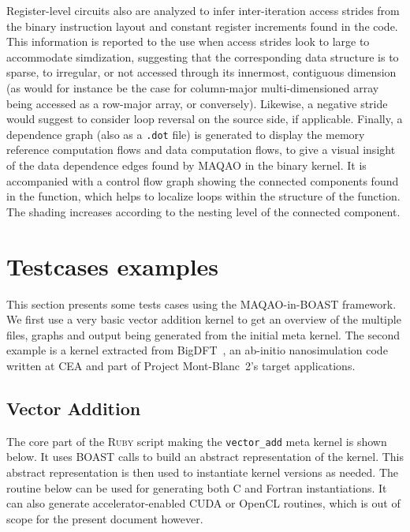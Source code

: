 \documentclass[11pt, a4paper, twoside]{montblanc2}
\def\ruby{\textsc{Ruby}\xspace}
\begin{document}
Register-level circuits also are analyzed to infer inter-iteration access 
strides from the binary instruction layout and constant register increments 
found in the code. This information is reported to the use when access strides 
look to large to accommodate simdization, suggesting that the corresponding data 
structure is to sparse, to irregular, or not accessed through its innermost, 
contiguous dimension (as would for instance be the case for column-major 
multi-dimensioned array being accessed as a row-major array, or conversely). 
Likewise, a negative stride would suggest to consider loop reversal on the 
source side, if applicable. Finally, a dependence graph (also as a \verb|.dot| 
file) is generated to display the memory reference computation flows and data 
computation flows, to give a visual insight of the data dependence edges found 
by MAQAO in the binary kernel. It is accompanied with a control flow graph 
showing the connected components found in the function, which helps to localize 
loops within the structure of the function. The shading increases according to 
the nesting level of the connected component.

\section{Testcases examples}\label{sec:examples}

This section presents some tests cases using the MAQAO-in-BOAST framework. We 
first use a very basic vector addition kernel to get an overview of the multiple 
files, graphs and output being generated from the initial meta kernel. The 
second example is a kernel extracted from 
BigDFT~\cite{genovese:bigdft:jcp:2008}, an ab-initio nanosimulation code written 
at CEA and part of Project Mont-Blanc~2's target applications.

  \subsection{Vector Addition}

  The core part of the \ruby script making the \verb|vector_add| meta kernel is 
  shown below. It uses BOAST calls to build an abstract representation of the 
  kernel. This abstract representation is then used to instantiate kernel 
  versions as needed. The routine below can be used for generating both C and 
  Fortran instantiations. It can also generate accelerator-enabled CUDA or 
  OpenCL routines, which is out of scope for the present document however.
  
\end{document}
